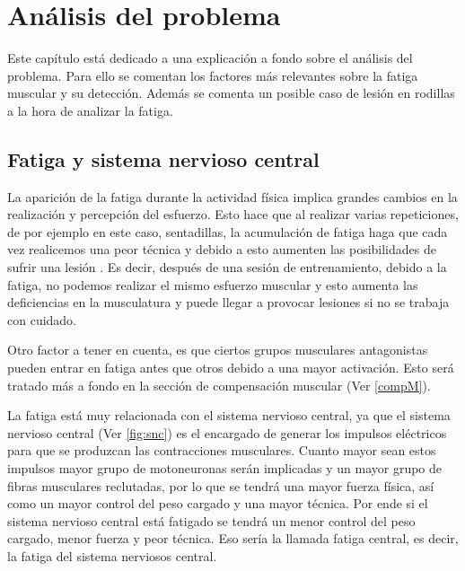 \chapter{Análisis del problema \label{analisis}}
Este capítulo está dedicado a una explicación a fondo sobre el análisis del problema. Para ello se comentan los factores más relevantes sobre la fatiga muscular y su detección. Además se comenta un posible caso de lesión en rodillas a la hora de analizar la fatiga.


\section{Fatiga y sistema nervioso central}

La aparición de la fatiga durante la actividad física implica grandes cambios en la realización y percepción del esfuerzo. Esto hace que al realizar varias repeticiones, de por ejemplo en este caso, sentadillas, la acumulación de fatiga haga que cada vez realicemos una peor técnica y debido a esto aumenten las posibilidades de sufrir una lesión \cite{moreno2017fatiga}. Es decir, después de una sesión de entrenamiento, debido a la fatiga, no podemos realizar el mismo esfuerzo muscular y esto aumenta las deficiencias en la musculatura y puede llegar a provocar lesiones si no se trabaja con cuidado.


Otro factor a tener en cuenta, es que ciertos grupos musculares antagonistas pueden entrar en fatiga antes que otros debido a una mayor activación. Esto será tratado más a fondo en la sección de compensación muscular (Ver \ref{compM}). 

La fatiga está muy relacionada con el sistema nervioso central, ya que el sistema nervioso central (Ver \ref{fig:snc}) es el encargado de generar los impulsos eléctricos para que se produzcan las contracciones musculares. Cuanto mayor sean estos impulsos mayor grupo de motoneuronas serán implicadas y un mayor grupo de fibras musculares reclutadas, por lo que se tendrá una mayor fuerza física, así como un mayor control del peso cargado y una mayor técnica. Por ende si el sistema nervioso central está fatigado se tendrá un menor control del peso cargado, menor fuerza y peor técnica. Eso sería la llamada fatiga central, es decir, la fatiga del sistema nerviosos central.

